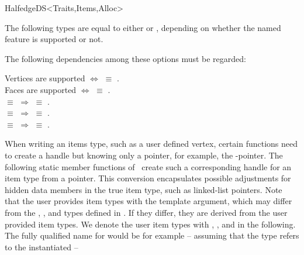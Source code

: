 \begin{ccRefConcept}{HalfedgeDS<Traits,Items,Alloc>}
\begin{ccAdvanced}

The following types are equal to either  or
, depending on whether the named feature is
supported or not.
\newpage

\ccGlue
{}
\ccGlue
{}
\ccGlue
{}
\ccGlue
{}
\ccGlue
{}

The following dependencies among these options must be regarded:

Vertices are supported $\Longleftrightarrow$
 $\equiv$ .
\\
Faces are supported $\Longleftrightarrow$
 $\equiv$ .
\\
 $\equiv$  $\Longrightarrow$
 $\equiv$ .
\\
 $\equiv$  $\Longrightarrow$
 $\equiv$ .
\\
 $\equiv$  $\Longrightarrow$
 $\equiv$ .


\end{ccAdvanced}

\begin{ccAdvanced}

When writing an items type, such as a user defined vertex, certain
functions need to create a handle but knowing only a pointer, for
example, the -pointer. The following static member functions
of \ccRefName\ create such a corresponding handle for an item type
from a pointer. This conversion encapsulates possible adjustments for
hidden data members in the true item type, such as linked-list
pointers. Note that the user provides item types with the
 template argument, which may differ from the ,
, and  types defined in \ccRefName. If they 
differ, they are derived from the user provided item types. We denote the
user item types with , , and
 in the following. The fully qualified name for 
 would be for example -- assuming that the type 
refers to the instantiated  --


\end{ccAdvanced}
\end{ccRefConcept}
